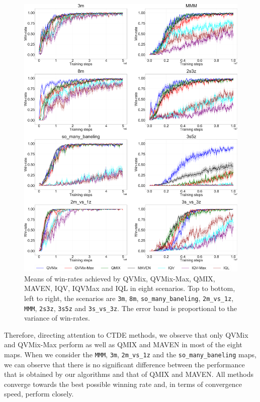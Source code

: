 \begin{figure}
\centering
\includegraphics[width=.95\linewidth]{tex_thesis/figures/ch4/all_win.pdf}
\caption{Means of win-rates achieved by QVMix, QVMix-Max, QMIX, MAVEN, IQV, IQVMax and IQL in eight scenarios. Top to bottom, left to right, the scenarios are \texttt{3m}, \texttt{8m}, \texttt{so\_many\_baneling}, \texttt{2m\_vs\_1z}, \texttt{MMM}, \texttt{2s3z}, \texttt{3s5z} and \texttt{3s\_vs\_3z}. The error band is proportional to the variance of win-rates.}
\label{fig:all_win_curves}
\end{figure}

Therefore, directing attention to CTDE methods, we observe that only QVMix and QVMix-Max perform as well as QMIX and MAVEN in most of the eight maps.
When we consider the \texttt{MMM}, \texttt{3m}, \texttt{2m\_vs\_1z} and the \texttt{so\_many\_baneling} maps, we can observe that there is no significant difference between the performance that is obtained by our algorithms and that of QMIX and MAVEN. 
All methods converge towards the best possible winning rate and, in terms of convergence speed, perform closely.

